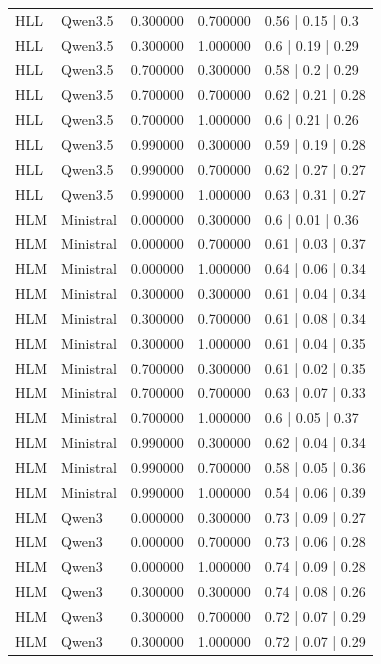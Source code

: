 \begin{longtable}{lllll}
HLL & Qwen3.5 & 0.300000 & 0.700000 & 0.56 | 0.15 | 0.3 \\
HLL & Qwen3.5 & 0.300000 & 1.000000 & 0.6 | 0.19 | 0.29 \\
HLL & Qwen3.5 & 0.700000 & 0.300000 & 0.58 | 0.2 | 0.29 \\
HLL & Qwen3.5 & 0.700000 & 0.700000 & 0.62 | 0.21 | 0.28 \\
HLL & Qwen3.5 & 0.700000 & 1.000000 & 0.6 | 0.21 | 0.26 \\
HLL & Qwen3.5 & 0.990000 & 0.300000 & 0.59 | 0.19 | 0.28 \\
HLL & Qwen3.5 & 0.990000 & 0.700000 & 0.62 | 0.27 | 0.27 \\
HLL & Qwen3.5 & 0.990000 & 1.000000 & 0.63 | 0.31 | 0.27 \\
HLM & Ministral & 0.000000 & 0.300000 & 0.6 | 0.01 | 0.36 \\
HLM & Ministral & 0.000000 & 0.700000 & 0.61 | 0.03 | 0.37 \\
HLM & Ministral & 0.000000 & 1.000000 & 0.64 | 0.06 | 0.34 \\
HLM & Ministral & 0.300000 & 0.300000 & 0.61 | 0.04 | 0.34 \\
HLM & Ministral & 0.300000 & 0.700000 & 0.61 | 0.08 | 0.34 \\
HLM & Ministral & 0.300000 & 1.000000 & 0.61 | 0.04 | 0.35 \\
HLM & Ministral & 0.700000 & 0.300000 & 0.61 | 0.02 | 0.35 \\
HLM & Ministral & 0.700000 & 0.700000 & 0.63 | 0.07 | 0.33 \\
HLM & Ministral & 0.700000 & 1.000000 & 0.6 | 0.05 | 0.37 \\
HLM & Ministral & 0.990000 & 0.300000 & 0.62 | 0.04 | 0.34 \\
HLM & Ministral & 0.990000 & 0.700000 & 0.58 | 0.05 | 0.36 \\
HLM & Ministral & 0.990000 & 1.000000 & 0.54 | 0.06 | 0.39 \\
HLM & Qwen3 & 0.000000 & 0.300000 & 0.73 | 0.09 | 0.27 \\
HLM & Qwen3 & 0.000000 & 0.700000 & 0.73 | 0.06 | 0.28 \\
HLM & Qwen3 & 0.000000 & 1.000000 & 0.74 | 0.09 | 0.28 \\
HLM & Qwen3 & 0.300000 & 0.300000 & 0.74 | 0.08 | 0.26 \\
HLM & Qwen3 & 0.300000 & 0.700000 & 0.72 | 0.07 | 0.29 \\
HLM & Qwen3 & 0.300000 & 1.000000 & 0.72 | 0.07 | 0.29 \\

\end{longtable}
